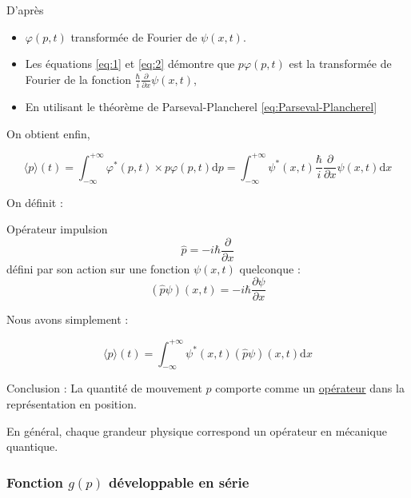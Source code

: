 D'après 
\begin{itemize}

  \item $\varphi(p,t)$ transformée de Fourier de $\psi(x,t)$.
  \item Les équations \ref{eq:1} et \ref{eq:2} démontre que $p \varphi(p,t)$ est la transformée de Fourier de la fonction $\frac{\hbar}{i} \frac{\partial }{\partial x} \psi(x,t)$,
  \item En utilisant le théorème de Parseval-Plancherel \ref{eq:Parseval-Plancherel}
    

\end{itemize}

On obtient enfin,


\begin{equation}
  \langle p \rangle(t) = \int_{- \infty}^{+ \infty} \varphi ^{*}(p,t) \times p \varphi(p,t) \mathrm{d}p = \int_{- \infty}^{+ \infty} \psi ^{*}(x, t) \frac{\hbar}{i}  \frac{\partial }{\partial x} \psi (x,t) \mathrm{d}x
\end{equation}

On définit :
\begin{Definition}[colbacktitle=red!75!black]{Opérateur impulsion}{}
\begin{equation}
  \hat{p} = - i \hbar \frac{\partial }{\partial x} 
  \label{eq:Opérateur impulsion}
\end{equation}
défini par son action sur une fonction $\psi(x,t)$ quelconque :
\begin{equation}
  (\hat{p}\psi)(x, t) = - i \hbar \frac{\partial \psi}{\partial x} 
\end{equation}
\end{Definition}

Nous avons simplement : 


\begin{equation}
  \boxed{\langle p \rangle(t) = \int_{- \infty}^{+ \infty} \psi ^{*}(x,t) (\hat{p} \psi)(x,t) \mathrm{d} x} 
\end{equation}


Conclusion : La quantité de mouvement $p$ comporte comme un \underline{opérateur} dans la représentation en position.

\begin{note}{}{}
  En général, chaque grandeur physique correspond un opérateur en mécanique quantique.
\end{note}


\subsubsection{Fonction $g(p)$ développable en série} %
\label{sec:Fonction $g(p)$ développable en série}

